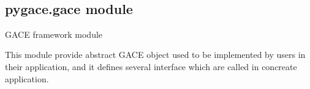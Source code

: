 \documentclass[letterpaper,10pt,english]{sphinxmanual}
\begin{document}

\begin{fulllineitems}
\label{\detokenize{pygace:pygace.ga.transfer_from}}~
\end{fulllineitems}



\subsection{pygace.gace module}
\label{\detokenize{pygace:module-pygace.gace}}\label{\detokenize{pygace:pygace-gace-module}}
GACE framework module

This module provide abstract GACE object used to be implemented by users in
their application, and it defines several interface which are called in
concreate application.
\end{document}
